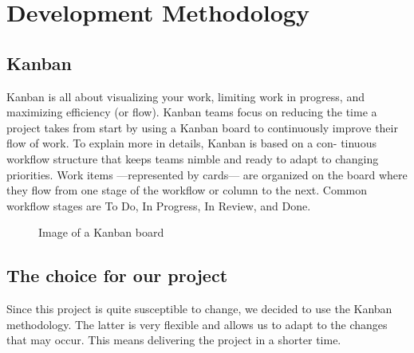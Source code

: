\section{Development Methodology}
\subsection{Kanban}
Kanban is all about visualizing your work, limiting work in progress, and
maximizing efficiency (or flow). Kanban teams focus on reducing the time a
project takes from start by using a Kanban board to continuously improve
their flow of work. To explain more in details, Kanban is based on a con-
tinuous workflow structure that keeps teams nimble and ready to adapt to
changing priorities. Work items —represented by cards— are organized on
the board where they flow from one stage of the workflow or column to the
next. Common workflow stages are To Do, In Progress, In Review, and
Done.

\begin{figure}[H]
    \centering
    \caption{Image of a Kanban board}
    \label{fig:kanban-board}
\end{figure}

\subsection{The choice for our project}
Since this project is quite susceptible to change, we decided to use the Kanban methodology. The latter is very flexible and allows us to adapt to the changes that may occur. This means delivering the project in a shorter time.

